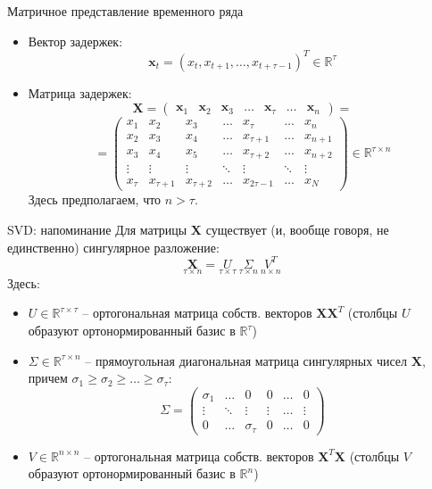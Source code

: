 \begin{frame}{Матричное представление временного ряда}
\begin{itemize}
    \item Вектор задержек: 
    $$ \mathbf{x}_t = (x_t, x_{t+1}, \dots, x_{t + \tau - 1})^T \in \mathbb{R}^{\tau}$$
    \item Матрица задержек:
    $$\mathbf{X} = 
    \begin{pmatrix}
    \mathbf{x}_1 & \mathbf{x}_2 & \mathbf{x}_3 & \dots & \mathbf{x}_{\tau} & \dots & \mathbf{x}_n
    \end{pmatrix} = $$
    $$ = \begin{pmatrix}
    x_1 & x_2 & x_3 & \dots & x_{\tau} & \dots & x_n \\
    x_2 & x_3 & x_4 & \dots & x_{\tau + 1} & \dots & x_{n + 1} \\
    x_3 & x_4 & x_5 & \dots & x_{\tau + 2} & \dots & x_{n + 2} \\
    \vdots & \vdots & \vdots & \ddots & \vdots & \ddots & \vdots \\
    x_{\tau} & x_{\tau + 1} & x_{\tau + 2} & \dots & x_{2\tau - 1} & \dots & x_N 
    \end{pmatrix} \in \mathbb{R}^{\tau \times n}$$
    Здесь предполагаем, что $n > \tau$.
\end{itemize}
\end{frame}
\begin{frame}{SVD: напоминание}
    Для матрицы $\mathbf{X}$ существует (и, вообще говоря, не единственно) сингулярное разложение:
    $$ \underset{\tau \times n}{\mathbf{X}} = \underset{\tau \times \tau}{U} \ \underset{\tau \times n}{\Sigma} \ \underset{n \times n}{V^T}$$
    Здесь:
    \begin{itemize}
        \item $U \in \mathbb{R}^{\tau \times \tau}$ -- ортогональная матрица собств. векторов $\mathbf{X}\mathbf{X}^T$ (столбцы $U$ образуют ортонормированный базис в $\mathbb{R}^{\tau}$)
        \item $\Sigma \in \mathbb{R}^{\tau \times n}$ -- прямоугольная диагональная матрица сингулярных чисел $\mathbf{X}$, причем $\sigma_1 \geq \sigma_2 \geq \dots \geq \sigma_{\tau}$:
        $$ \Sigma = \begin{pmatrix}
            \sigma_1  & \dots & 0 & 0 & \dots & 0 \\
            \vdots  & \ddots & \vdots & \vdots & \dots & \vdots \\
            0 &  \dots & \sigma_{\tau} & 0 & \dots & 0
        \end{pmatrix}$$
        \item $V \in \mathbb{R}^{n \times n}$ -- ортогональная матрица собств. векторов $\mathbf{X}^T\mathbf{X}$ (столбцы $V$ образуют ортонормированный базис в $\mathbb{R}^{n}$)
    \end{itemize}
\end{frame}


